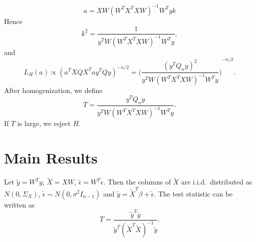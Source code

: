 \documentclass[review]{elsarticle}
\theoremstyle{plain}
\theoremstyle{definition}
\theoremstyle{remark}
\begin{document}
    \begin{equation}
        a=XW{(W^T X^T X W)}^{-1} W^T y k 
    \end{equation}
    Hence 
    \begin{equation}
        k^2=\frac{1}{y^T W{(W^T X^T X W)}^{-1} W^T y},
    \end{equation}
    and 
    \begin{equation}
        L_H (a)\propto {(a^T X Q X^T a y^T Q y)}^{-n/2}={\Big(\frac{{(y^T Q_n y)}^2}{y^T W{(W^T X^T X W)}^{-1} W^T y}\Big)}^{-n/2}.
    \end{equation}
After homogenization, we define
\[
    T=\frac{y^T Q_n y}{
        y^T W{(W^T X^T X W)}^{-1}W^T y
    }.
    \]
If $T$ is large, we reject $H$.












\section{Main Results}


Let $\tilde{y}=W^T y$, $\tilde{X}=XW$, $\tilde{\epsilon}=W^T \epsilon$. Then the columns of $\tilde{X}$ are i.i.d.\  distributed as $N(0,\Sigma_X)$, $\tilde{\epsilon}\sim N(0,\sigma^2 I_{n-1})$ and $\tilde{y}=\tilde{X}^T \beta + \tilde{\epsilon}$.
The test statistic can be written as
\[
    T=\frac{\tilde{y}^T \tilde{y}}{
        \tilde{y}^T{(\tilde{X}^T \tilde{X})}^{-1}\tilde{y}
    }.
    \]
\end{document}
